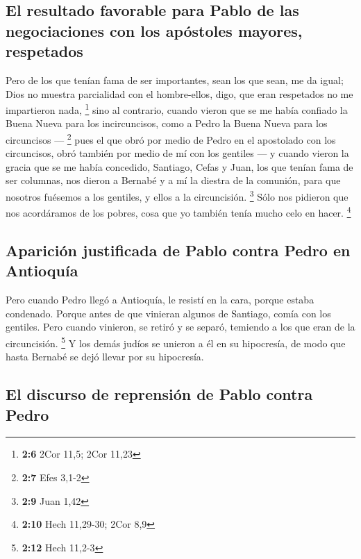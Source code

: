 \begin{paracol}{2}
\hypertarget{el-resultado-favorable-para-pablo-de-las-negociaciones-con-los-apuxf3stoles-mayores-respetados}{%
\subsection{El resultado favorable para Pablo de las negociaciones con
los apóstoles mayores,
respetados}\label{el-resultado-favorable-para-pablo-de-las-negociaciones-con-los-apuxf3stoles-mayores-respetados}}

 Pero de los que tenían fama de ser importantes, sean los
que sean, me da igual; Dios no muestra parcialidad con el hombre-ellos,
digo, que eran respetados no me impartieron nada, \footnote{\textbf{2:6}
  2Cor 11,5; 2Cor 11,23}  sino al contrario, cuando vieron
que se me había confiado la Buena Nueva para los incircuncisos, como a
Pedro la Buena Nueva para los circuncisos --- \footnote{\textbf{2:7}
  Efes 3,1-2}  pues el que obró por medio de Pedro en el
apostolado con los circuncisos, obró también por medio de mí con los
gentiles ---  y cuando vieron la gracia que se me había
concedido, Santiago, Cefas y Juan, los que tenían fama de ser columnas,
nos dieron a Bernabé y a mí la diestra de la comunión, para que nosotros
fuésemos a los gentiles, y ellos a la circuncisión. \footnote{\textbf{2:9}
  Juan 1,42}  Sólo nos pidieron que nos acordáramos de
los pobres, cosa que yo también tenía mucho celo en hacer. \footnote{\textbf{2:10}
  Hech 11,29-30; 2Cor 8,9}

\hypertarget{apariciuxf3n-justificada-de-pablo-contra-pedro-en-antioquuxeda}{%
\subsection{Aparición justificada de Pablo contra Pedro en
Antioquía}\label{apariciuxf3n-justificada-de-pablo-contra-pedro-en-antioquuxeda}}

 Pero cuando Pedro llegó a Antioquía, le resistí en la
cara, porque estaba condenado.  Porque antes de que
vinieran algunos de Santiago, comía con los gentiles. Pero cuando
vinieron, se retiró y se separó, temiendo a los que eran de la
circuncisión. \footnote{\textbf{2:12} Hech 11,2-3}  Y los
demás judíos se unieron a él en su hipocresía, de modo que hasta Bernabé
se dejó llevar por su hipocresía.

\hypertarget{el-discurso-de-reprensiuxf3n-de-pablo-contra-pedro}{%
\subsection{El discurso de reprensión de Pablo contra
Pedro}\label{el-discurso-de-reprensiuxf3n-de-pablo-contra-pedro}}


\end{paracol}
